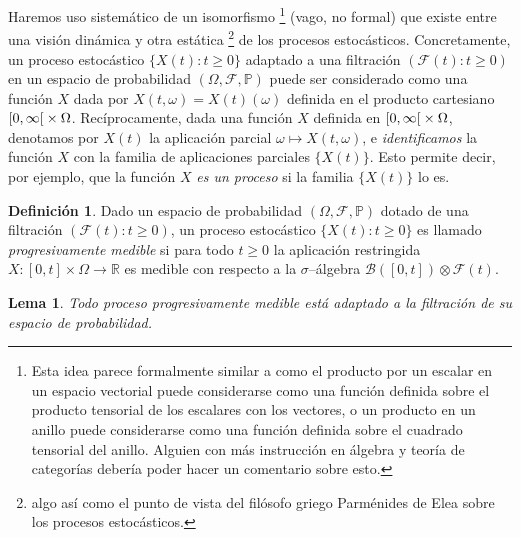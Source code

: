 \documentclass{report}
\newcommand{\leftOpenInterval}{\left]}
\newcommand{\rightOpenInterval}{\right[}
\newcommand{\leftClosedInterval}{\left[}
\newcommand{\rightClosedInterval}{\right]}
\newcommand{\interval}[3]{%
    \ifstrequal{#1}{oo}{%
      \leftOpenInterval #2, #3 \rightOpenInterval%
    }{%
      \ifstrequal{#1}{co}{%
        \leftClosedInterval #2, #3 \rightOpenInterval%
      }{%
        \ifstrequal{#1}{oc}{
          \leftOpenInterval #2, #3 \rightClosedInterval%
        }{%
          \ifstrequal{#1}{cc}{
            \leftClosedInterval #2, #3 \rightClosedInterval
          }{%
          }%
        }%
      }%
    }%
  }
\newcommand{\prob}{\mathbb{P}}
\newcommand{\events}{\mathcal{F}}
\newcommand{\borel}{\mathscr{B}}
\newcommand{\realNumbers}{\mathbb{R}}
\theoremstyle{plain}
\newtheorem{lemma}{Lema}
\theoremstyle{remark}
\theoremstyle{definition}
\newtheorem{definition}{Definición}
\begin{document}
Haremos uso sistemático de un isomorfismo%
\footnote{Esta idea parece formalmente similar a como el producto por un escalar en un espacio vectorial puede considerarse como una función definida sobre el producto tensorial de los escalares con los vectores, o un producto en un anillo puede considerarse como una función definida sobre el cuadrado tensorial del anillo.
Alguien con más instrucción en álgebra y teoría de categorías debería poder hacer un comentario sobre esto.}
(vago, no formal) que existe entre una visión dinámica y otra estática%
\footnote{algo así como el punto de vista del filósofo griego Parménides de Elea sobre los procesos estocásticos.}
de los procesos estocásticos.
Concretamente, un proceso estocástico \(\{X(t) : t \geq 0\}\) adaptado a una filtración \((\events(t) : t \geq 0)\) en un espacio de probabilidad \((\Omega, \events, \prob)\) puede ser considerado como una función \(X\) dada por \(X(t, \omega) = X(t)(\omega)\) definida en el producto cartesiano \(\interval{co}{0}{\infty} \times \Omega\).
Recíprocamente, dada una función \(X\) definida en \(\interval{co}{0}{\infty} \times \Omega\), denotamos por \(X(t)\) la aplicación parcial \(\omega \mapsto X(t, \omega)\), e \emph{identificamos} la función \(X\) con la familia de aplicaciones parciales \(\{X(t)\}\).
Esto permite decir, por ejemplo, que la función \(X\) \emph{es un proceso} si la familia \(\{X(t)\}\) lo es.



\begin{definition}
  Dado un espacio de probabilidad \((\Omega, \events, \prob)\) dotado de una filtración \((\events(t) : t \geq 0)\), un proceso estocástico \(\{X(t) : t \geq 0\}\) es llamado \emph{progresivamente medible} si para todo \(t \geq 0\) la aplicación restringida \(X : [0, t] \times \Omega \rightarrow \realNumbers\) es medible con respecto a la \(\sigma\)--álgebra \(\borel([0, t]) \otimes \events(t)\).
\end{definition}

\begin{lemma}
  Todo proceso progresivamente medible está adaptado a la filtración de su espacio de probabilidad.
\end{lemma}
\end{document}
